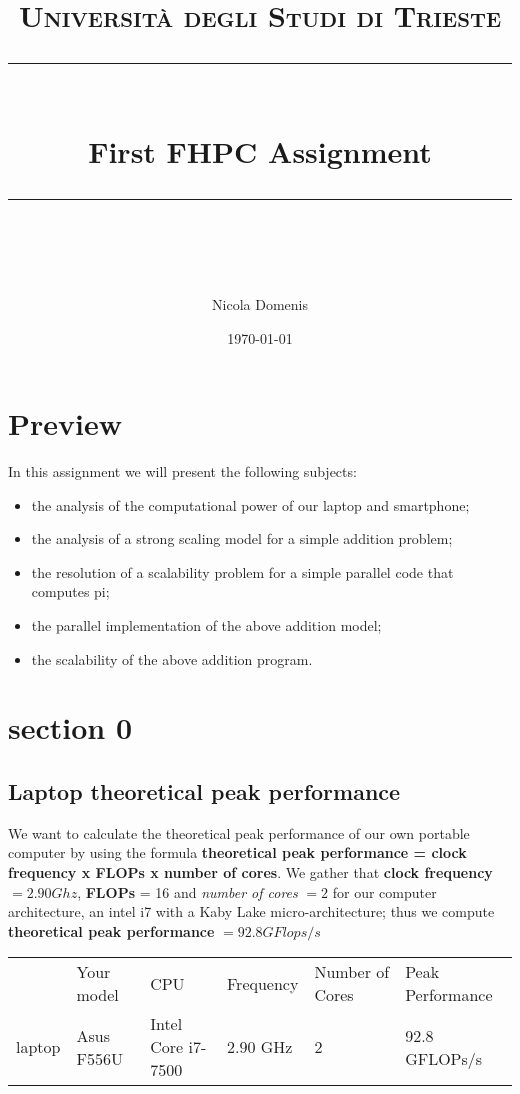 \documentclass[11pt]{scrartcl} %
\title{	
	\normalfont\normalsize
	\textsc{Università degli Studi di Trieste}\\ %
	\vspace{25pt} %
	\rule{\linewidth}{0.5pt}\\ %
	\vspace{20pt} %
	{\huge First FHPC Assignment}\\ %
	\vspace{12pt} %
	\rule{\linewidth}{2pt}\\ %
	\vspace{12pt} %
}
\author{\LARGE Nicola Domenis} %
\date{\normalsize\today} %
\begin{document}
\maketitle %


\section{Preview}
 
In this assignment we will present the following subjects:

\begin{itemize}
	\item the analysis of the computational power of our laptop and smartphone;
	\item the analysis of a strong scaling model for a simple addition problem;
	\item the resolution of a scalability problem for a simple parallel code that computes pi;
	\item the parallel implementation of the above addition model;
	\item the scalability of the above addition program.
\end{itemize}


\section{section 0}
\subsection{Laptop theoretical peak performance}

We want to calculate the theoretical peak performance of our own portable computer by using the formula \textbf{theoretical peak performance = clock frequency x FLOPs x number of cores}.
We gather that \textbf{clock frequency} $= 2.90 Ghz$, \textbf{FLOPs} = 16 and \textit{number of cores} $= 2$ for our computer architecture, an intel i7 with a Kaby Lake micro-architecture; thus we compute \textbf{theoretical peak performance} $= 92.8 GFlops/s$

\begin{table}[H]
		\begin{tabular}[H]{l| l| l| l| l| l }
			&Your model&CPU&Frequency&Number of Cores&Peak Performance\\
			laptop& Asus F556U & Intel Core i7-7500 &$2.90$ GHz&2&92.8 GFLOPs/s
		\end{tabular}
	\label{Result}
\end{table}
\end{document}
